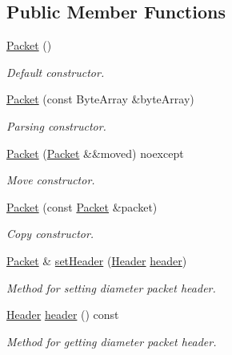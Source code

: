 \subsection*{Public Member Functions}
\begin{DoxyCompactItemize}
\item 
\mbox{\label{classDiameter_1_1Packet_a495c4db70c8a7f085076e07444d917c6}} 
\hyperlink{classDiameter_1_1Packet_a495c4db70c8a7f085076e07444d917c6}{Packet} ()
\begin{DoxyCompactList}\small\item\em Default constructor. \end{DoxyCompactList}\item 
\hyperlink{classDiameter_1_1Packet_a6d064316d887b5c9b99b6acfd2e2e54c}{Packet} (const Byte\+Array \&byte\+Array)
\begin{DoxyCompactList}\small\item\em Parsing constructor. \end{DoxyCompactList}\item 
\hyperlink{classDiameter_1_1Packet_a2bab0abbaf390210f24b0e4f9a10f58a}{Packet} (\hyperlink{classDiameter_1_1Packet}{Packet} \&\&moved) noexcept
\begin{DoxyCompactList}\small\item\em Move constructor. \end{DoxyCompactList}\item 
\hyperlink{classDiameter_1_1Packet_a4faed7c2dbc68943e4aa6a500f58e5d6}{Packet} (const \hyperlink{classDiameter_1_1Packet}{Packet} \&packet)
\begin{DoxyCompactList}\small\item\em Copy constructor. \end{DoxyCompactList}\item 
\hyperlink{classDiameter_1_1Packet}{Packet} \& \hyperlink{classDiameter_1_1Packet_ac37c0f3736cc87e553ecb7b60e6962b2}{set\+Header} (\hyperlink{classDiameter_1_1Packet_1_1Header}{Header} \hyperlink{classDiameter_1_1Packet_a9afb9a360694064175f2684bcd1668ce}{header})
\begin{DoxyCompactList}\small\item\em Method for setting diameter packet header. \end{DoxyCompactList}\item 
\hyperlink{classDiameter_1_1Packet_1_1Header}{Header} \hyperlink{classDiameter_1_1Packet_a9afb9a360694064175f2684bcd1668ce}{header} () const
\begin{DoxyCompactList}\small\item\em Method for getting diameter packet header. \end{DoxyCompactList}\item 

\end{DoxyCompactItemize}
